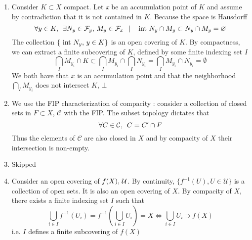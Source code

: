 \begin{myproof}
	\begin{enumerate}[label = \roman*.]
		\item Consider $K \subset X$ compact. Let \textit{x} be an accumulation point of $K$ and assume by contradiction that it is not contained in $K$. \enskip Because the space is Hausdorff
			$$\forall y \in K, \enskip \exists N_{y} \in \mathcal{F}_y, \thinspace M_{y} \in \mathcal{F}_x \enspace \mid \enspace \textrm{ int } N_y \cap M_y \subset N_y \cap M_y = \emptyset{}$$
			The collection $\{\textrm{ int } N_y, \thinspace y \in K\}$ is an open covering of $K$. By compactness, we can extract a finite subcovering of $K$, defined by some finite indexing set $I$
			$$\bigcap_{I} M_{y_i} \cap K \subset \bigcap_{I} M_{y_i} \cap \bigcap_{I} N_{y_i} = \bigcap_{I} M_{y_i} \cap N_{y_i} = \emptyset{}$$
			We both have that $x$ is an accumulation point and that the neighborhood $\bigcap\limits_{I} M_{y_i}$ does not intersect $K$, \thinspace $\bot$
		\item We use the FIP characterization of compacity : consider a collection of closed sets in $F \subset X$, $\mathcal{C}$ with the FIP. The subset topology dictates that
			$$\forall C \in \mathcal{C}, \enskip C = C' \cap F$$
		Thus the elements of $\mathcal{C}$ are also closed in $X$ and by compacity of $X$ their intersection is non-empty.
		\item Skipped
		\item Consider an open covering of $f(X), \thinspace \mathcal{U}$. \thinspace By continuity, $\{f^{-1}( U ), U \in \mathcal{U}\}$ is a collection of open sets. It is also an open covering of $X$. By compacity of $X$, there exists a finite indexing set $I$ such that
		$$ \bigcup_{i \in I} f^{-1} ( U_i ) = f^{-1} ( \bigcup_{i \in I} U_i ) = X \iff \bigcup_{i \in I} U_i \supset f(X)$$
		i.e. $I$ defines a finite subcovering of $f(X)$
	\end{enumerate}
\end{myproof}

